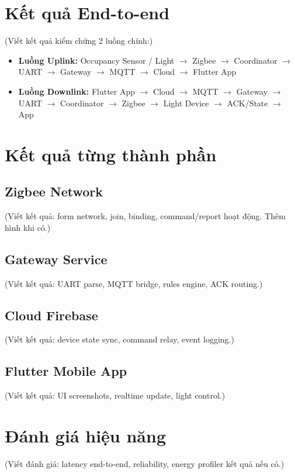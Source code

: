 \section{Kết quả End-to-end}
\label{sec:ch4-e2e-results}

(Viết kết quả kiểm chứng 2 luồng chính:)

\begin{itemize}
    \item \textbf{Luồng Uplink:} Occupancy Sensor / Light $\rightarrow$ Zigbee $\rightarrow$ Coordinator $\rightarrow$ UART $\rightarrow$ Gateway $\rightarrow$ MQTT $\rightarrow$ Cloud $\rightarrow$ Flutter App
    \item \textbf{Luồng Downlink:} Flutter App $\rightarrow$ Cloud $\rightarrow$ MQTT $\rightarrow$ Gateway $\rightarrow$ UART $\rightarrow$ Coordinator $\rightarrow$ Zigbee $\rightarrow$ Light Device $\rightarrow$ ACK/State $\rightarrow$ App
\end{itemize}

\section{Kết quả từng thành phần}
\label{sec:ch4-component-results}

\subsection{Zigbee Network}
\label{sec:ch4-zigbee-results}

(Viết kết quả: form network, join, binding, command/report hoạt động. Thêm hình khi có.)

\subsection{Gateway Service}
\label{sec:ch4-gateway-results}

(Viết kết quả: UART parse, MQTT bridge, rules engine, ACK routing.)

\subsection{Cloud Firebase}
\label{sec:ch4-cloud-results}

(Viết kết quả: device state sync, command relay, event logging.)

\subsection{Flutter Mobile App}
\label{sec:ch4-app-results}

(Viết kết quả: UI screenshots, realtime update, light control.)

\section{Đánh giá hiệu năng}
\label{sec:ch4-performance}

(Viết đánh giá: latency end-to-end, reliability, energy profiler kết quả nếu có.)


\newpage
